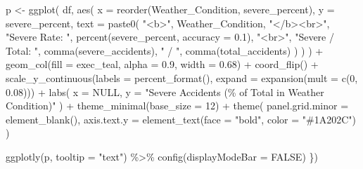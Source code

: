 \documentclass[
  letterpaper,
  DIV=11,
  numbers=noendperiod]{scrartcl}
\newenvironment{Shaded}{\begin{snugshade}}{\end{snugshade}}
\newcommand{\AttributeTok}[1]{\textcolor[rgb]{0.40,0.45,0.13}{#1}}
\newcommand{\ConstantTok}[1]{\textcolor[rgb]{0.56,0.35,0.01}{#1}}
\newcommand{\DecValTok}[1]{\textcolor[rgb]{0.68,0.00,0.00}{#1}}
\newcommand{\FloatTok}[1]{\textcolor[rgb]{0.68,0.00,0.00}{#1}}
\newcommand{\FunctionTok}[1]{\textcolor[rgb]{0.28,0.35,0.67}{#1}}
\newcommand{\NormalTok}[1]{\textcolor[rgb]{0.00,0.23,0.31}{#1}}
\newcommand{\OtherTok}[1]{\textcolor[rgb]{0.00,0.23,0.31}{#1}}
\newcommand{\SpecialCharTok}[1]{\textcolor[rgb]{0.37,0.37,0.37}{#1}}
\newcommand{\StringTok}[1]{\textcolor[rgb]{0.13,0.47,0.30}{#1}}
\begin{document}
\begin{Shaded}
\begin{Highlighting}[]
\NormalTok{    p }\OtherTok{\textless{}{-}} \FunctionTok{ggplot}\NormalTok{(}
\NormalTok{      df,}
      \FunctionTok{aes}\NormalTok{(}
        \AttributeTok{x =} \FunctionTok{reorder}\NormalTok{(Weather\_Condition, severe\_percent),}
        \AttributeTok{y =}\NormalTok{ severe\_percent,}
        \AttributeTok{text =} \FunctionTok{paste0}\NormalTok{(}
          \StringTok{"\textless{}b\textgreater{}"}\NormalTok{, Weather\_Condition, }\StringTok{"\textless{}/b\textgreater{}\textless{}br\textgreater{}"}\NormalTok{,}
          \StringTok{"Severe Rate: "}\NormalTok{, }\FunctionTok{percent}\NormalTok{(severe\_percent, }\AttributeTok{accuracy =} \FloatTok{0.1}\NormalTok{), }\StringTok{"\textless{}br\textgreater{}"}\NormalTok{,}
          \StringTok{"Severe / Total: "}\NormalTok{, }\FunctionTok{comma}\NormalTok{(severe\_accidents), }\StringTok{" / "}\NormalTok{, }\FunctionTok{comma}\NormalTok{(total\_accidents)}
\NormalTok{        )}
\NormalTok{      )}
\NormalTok{    ) }\SpecialCharTok{+}
      \FunctionTok{geom\_col}\NormalTok{(}\AttributeTok{fill =}\NormalTok{ exec\_teal, }\AttributeTok{alpha =} \FloatTok{0.9}\NormalTok{, }\AttributeTok{width =} \FloatTok{0.68}\NormalTok{) }\SpecialCharTok{+}
      \FunctionTok{coord\_flip}\NormalTok{() }\SpecialCharTok{+}
      \FunctionTok{scale\_y\_continuous}\NormalTok{(}\AttributeTok{labels =} \FunctionTok{percent\_format}\NormalTok{(), }\AttributeTok{expand =} \FunctionTok{expansion}\NormalTok{(}\AttributeTok{mult =} \FunctionTok{c}\NormalTok{(}\DecValTok{0}\NormalTok{, }\FloatTok{0.08}\NormalTok{))) }\SpecialCharTok{+}
      \FunctionTok{labs}\NormalTok{(}
        \AttributeTok{x =} \ConstantTok{NULL}\NormalTok{,}
        \AttributeTok{y =} \StringTok{"Severe Accidents (\% of Total in Weather Condition)"}
\NormalTok{      ) }\SpecialCharTok{+}
      \FunctionTok{theme\_minimal}\NormalTok{(}\AttributeTok{base\_size =} \DecValTok{12}\NormalTok{) }\SpecialCharTok{+}
      \FunctionTok{theme}\NormalTok{(}
        \AttributeTok{panel.grid.minor =} \FunctionTok{element\_blank}\NormalTok{(),}
        \AttributeTok{axis.text.y =} \FunctionTok{element\_text}\NormalTok{(}\AttributeTok{face =} \StringTok{"bold"}\NormalTok{, }\AttributeTok{color =} \StringTok{"\#1A202C"}\NormalTok{)}
\NormalTok{      )}

    \FunctionTok{ggplotly}\NormalTok{(p, }\AttributeTok{tooltip =} \StringTok{"text"}\NormalTok{) }\SpecialCharTok{\%\textgreater{}\%}
      \FunctionTok{config}\NormalTok{(}\AttributeTok{displayModeBar =} \ConstantTok{FALSE}\NormalTok{)}
\NormalTok{  \})}


\end{Highlighting}
\end{Shaded}
\end{document}
